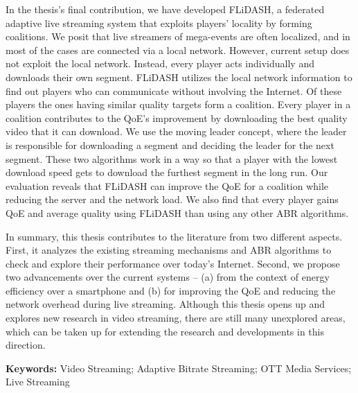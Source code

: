 {In the thesis's final contribution, we have developed FLiDASH, a federated adaptive live streaming system that exploits players' locality by forming coalitions. We posit that  live streamers of mega-events are often localized, and in most of the cases are connected via a local network. However, current setup does not exploit the local network. Instead, every player acts individually and downloads their own segment. FLiDASH utilizes the local network information to find out players who can communicate without involving the Internet. Of these players the ones having similar quality targets form a coalition. Every player in a coalition contributes to the QoE's improvement by downloading the best quality video that it can download. We use the moving leader concept, where the leader is responsible for downloading a segment and deciding the leader for the next segment. These two algorithms work in a way so that a player with the lowest download speed gets to download the furthest segment in the long run. Our evaluation reveals that FLiDASH can improve the QoE for a coalition while reducing the server and the network load. We also find that every player gains QoE and average quality using FLiDASH than using any other ABR algorithms.

In summary, this thesis contributes to the literature from two different aspects. First, it analyzes the existing streaming mechanisms and ABR algorithms to check and explore their performance over today's Internet. Second, we propose two advancements over the current systems -- (a) from the context of energy efficiency over a smartphone and (b) for improving the QoE and reducing the network overhead during live streaming. Although this thesis opens up and explores new research in video streaming, there are still many unexplored areas, which can be taken up for extending the research and developments in this direction. 

\textbf{Keywords:} Video Streaming; Adaptive Bitrate Streaming; OTT Media Services; Live Streaming
\thispagestyle{empty}
}

